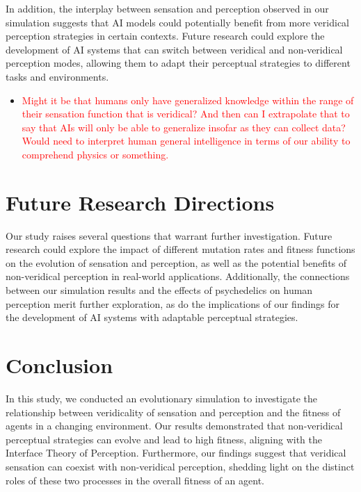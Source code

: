 \documentclass{article}[10pt]
\begin{document}
In addition, the interplay between sensation and perception observed in our simulation suggests that AI models could potentially benefit from more veridical perception strategies in certain contexts. Future research could explore the development of AI systems that can switch between veridical and non-veridical perception modes, allowing them to adapt their perceptual strategies to different tasks and environments.

\begin{itemize}
    \item \textcolor{red}{Might it be that humans only have generalized knowledge within the range of their sensation function that is veridical?
    And then can I extrapolate that to say that AIs will only be able to generalize insofar as they can collect data?
    Would need to interpret human general intelligence in terms of our ability to comprehend physics or something.}
\end{itemize}

\section{Future Research Directions}

Our study raises several questions that warrant further investigation. Future research could explore the impact of different mutation rates and fitness functions on the evolution of sensation and perception, as well as the potential benefits of non-veridical perception in real-world applications. Additionally, the connections between our simulation results and the effects of psychedelics on human perception merit further exploration, as do the implications of our findings for the development of AI systems with adaptable perceptual strategies.

\section{Conclusion}

In this study, we conducted an evolutionary simulation to investigate the relationship between veridicality of sensation and perception and the fitness of agents in a changing environment. Our results demonstrated that non-veridical perceptual strategies can evolve and lead to high fitness, aligning with the Interface Theory of Perception. Furthermore, our findings suggest that veridical sensation can coexist with non-veridical perception, shedding light on the distinct roles of these two processes in the overall fitness of an agent.
\end{document}
